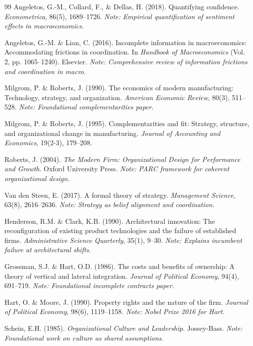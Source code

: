 \begin{thebibliography}{99}
 Angeletos, G.-M., Collard, F., \& Dellas, H. (2018). Quantifying confidence. \textit{Econometrica}, 86(5), 1689--1726. \textit{Note: Empirical quantification of sentiment effects in macroeconomics.}

 Angeletos, G.-M. \& Lian, C. (2016). Incomplete information in macroeconomics: Accommodating frictions in coordination. In \textit{Handbook of Macroeconomics} (Vol. 2, pp. 1065--1240). Elsevier. \textit{Note: Comprehensive review of information frictions and coordination in macro.}

 Milgrom, P. \& Roberts, J. (1990). The economics of modern manufacturing: Technology, strategy, and organization. \textit{American Economic Review}, 80(3), 511--528. \textit{Note: Foundational complementarities paper.}

 Milgrom, P. \& Roberts, J. (1995). Complementarities and fit: Strategy, structure, and organizational change in manufacturing. \textit{Journal of Accounting and Economics}, 19(2-3), 179--208.

 Roberts, J. (2004). \textit{The Modern Firm: Organizational Design for Performance and Growth}. Oxford University Press. \textit{Note: PARC framework for coherent organizational design.}

 Van den Steen, E. (2017). A formal theory of strategy. \textit{Management Science}, 63(8), 2616--2636. \textit{Note: Strategy as belief alignment and coordination.}

 Henderson, R.M. \& Clark, K.B. (1990). Architectural innovation: The reconfiguration of existing product technologies and the failure of established firms. \textit{Administrative Science Quarterly}, 35(1), 9--30. \textit{Note: Explains incumbent failure at architectural shifts.}

 Grossman, S.J. \& Hart, O.D. (1986). The costs and benefits of ownership: A theory of vertical and lateral integration. \textit{Journal of Political Economy}, 94(4), 691--719. \textit{Note: Foundational incomplete contracts paper.}

 Hart, O. \& Moore, J. (1990). Property rights and the nature of the firm. \textit{Journal of Political Economy}, 98(6), 1119--1158. \textit{Note: Nobel Prize 2016 for Hart.}

 Schein, E.H. (1985). \textit{Organizational Culture and Leadership}. Jossey-Bass. \textit{Note: Foundational work on culture as shared assumptions.}


\end{thebibliography}
